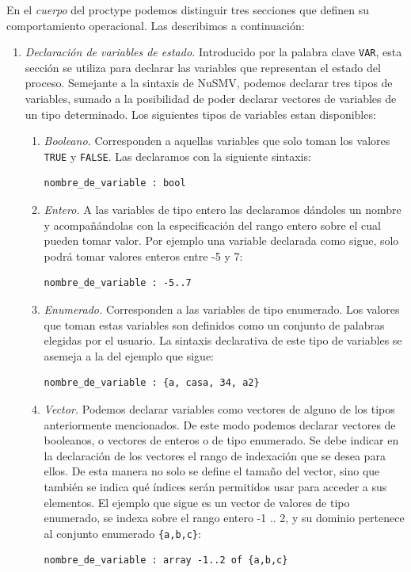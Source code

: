 \documentclass[pdftex,a4paper,12pt]{book}
\begin{document}
En el \textit{cuerpo} del proctype podemos distinguir tres secciones que definen su comportamiento operacional. Las describimos a continuaci\'on:
\begin{enumerate}
\item \textit{Declaraci\'on de variables de estado.} Introducido por la palabra clave \texttt{VAR}, esta secci\'on se utiliza para declarar las variables que representan el estado del proceso. Semejante a la sintaxis de NuSMV, podemos declarar tres tipos de variables, sumado a la posibilidad de poder declarar vectores de variables de un tipo determinado. Los siguientes tipos de variables estan disponibles:
\begin{enumerate}
\item \textit{Booleano.} Corresponden a aquellas variables que solo toman los valores \texttt{TRUE} y \texttt{FALSE}. Las declaramos con la siguiente sintaxis: \begin{verbatim}nombre_de_variable : bool\end{verbatim}
\item \textit{Entero.} A las variables de tipo entero las declaramos d\'andoles un nombre y acompa\~n\'andolas con la especificaci\'on del rango entero sobre el cual pueden tomar valor. Por ejemplo una variable declarada como sigue, solo podr\'a tomar valores enteros entre -5 y 7: \begin{verbatim}nombre_de_variable : -5..7\end{verbatim}
\item \textit{Enumerado.} Corresponden a las variables de tipo enumerado. Los valores que toman estas variables son definidos como un conjunto de palabras elegidas por el usuario. La sintaxis declarativa de este tipo de variables se asemeja a la del ejemplo que sigue: \begin{verbatim}nombre_de_variable : {a, casa, 34, a2}\end{verbatim}
\item \textit{Vector.} Podemos declarar variables como vectores de alguno de los tipos anteriormente mencionados. De este modo podemos declarar vectores de booleanos, o vectores de enteros o de tipo enumerado. Se debe indicar en la declaraci\'on de los vectores el rango de indexaci\'on que se desea para ellos. De esta manera no solo se define el tama\~no del vector, sino que tambi\'en se indica qu\'e \'indices ser\'an permitidos usar para acceder a sus elementos. El ejemplo que sigue es un vector de valores de tipo enumerado, se indexa sobre el rango entero -1 .. 2, y su dominio pertenece al conjunto enumerado \texttt{\{a,b,c\}}: \begin{verbatim}nombre_de_variable : array -1..2 of {a,b,c}\end{verbatim}
\end{enumerate}


\end{enumerate}
\end{document}
